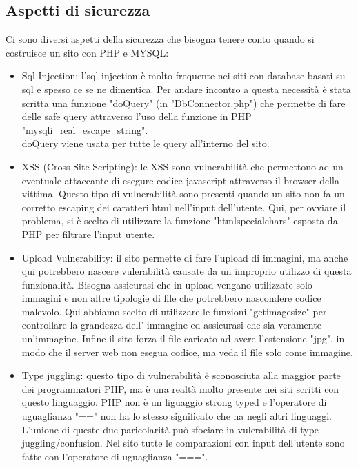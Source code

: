 \documentclass[openany, a4paper, 12pt]{report}
\begin{document}
		\subsection{Aspetti di sicurezza}
			Ci sono diversi aspetti della sicurezza che bisogna tenere conto quando si costruisce un sito con PHP e MYSQL:
			\begin{itemize}
				\item Sql Injection: l'sql injection è molto frequente nei siti con database basati su sql e spesso ce se ne dimentica. Per andare incontro a questa necessità è stata scritta una funzione "doQuery" (in "DbConnector.php") che permette di fare delle safe query attraverso l'uso della funzione in PHP "mysqli\_real\_escape\_string".\\
				doQuery viene usata per tutte le query all'interno del sito.

				\item XSS (Cross-Site Scripting): le XSS sono vulnerabilità che permettono ad un eventuale attaccante di esegure codice javascript attraverso il browser della vittima. Questo tipo di vulnerabilità sono presenti quando un sito non fa un corretto escaping dei caratteri html nell'input dell'utente. Qui, per ovviare il problema, si è scelto di utilizzare la funzione "htmlspecialchars" esposta da PHP per filtrare l'input utente.

				\item Upload Vulnerability: il sito permette di fare l'upload di immagini, ma anche qui potrebbero nascere vulerabilità causate da un improprio utilizzo di questa funzionalità. Bisogna assicurasi che in upload vengano utilizzate solo immagini e non altre tipologie di file che potrebbero nascondere codice malevolo. Qui abbiamo scelto di utilizzare le funzioni "getimagesize" per controllare la grandezza dell' immagine ed assicurasi che sia veramente un'immagine. Infine il sito forza il file caricato ad avere l'estensione "jpg", in modo che il server web non esegua codice, ma veda il file solo come immagine.

				\item Type juggling: questo tipo di vulnerabilità è sconosciuta alla maggior parte dei programmatori PHP, ma è una realtà molto presente nei siti scritti con questo linguaggio. PHP non è un liguaggio strong typed e l'operatore di uguaglianza "==" non ha lo stesso significato che ha negli altri linguaggi. L'unione di queste due paricolarità può sfociare in vulerabilità di type juggling/confusion. Nel sito tutte le comparazioni con input dell'utente sono fatte con l'operatore di uguaglianza "===".


\end{itemize}
\end{document}
